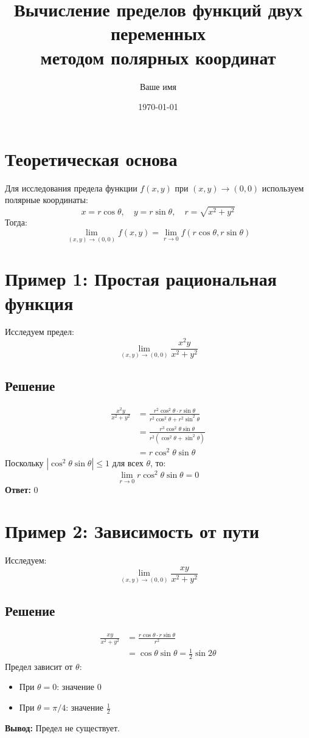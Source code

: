 \documentclass{article}
\title{Вычисление пределов функций двух переменных \\ методом полярных координат}
\author{Ваше имя}
\date{\today}
\begin{document}
\maketitle

\section{Теоретическая основа}
Для исследования предела функции $f(x,y)$ при $(x,y) \to (0,0)$ используем полярные координаты:
\[
x = r\cos\theta, \quad y = r\sin\theta, \quad r = \sqrt{x^2 + y^2}
\]
Тогда:
\[
\lim_{(x,y)\to(0,0)} f(x,y) = \lim_{r\to 0} f(r\cos\theta, r\sin\theta)
\]

\section{Пример 1: Простая рациональная функция}
Исследуем предел:
\[
\lim_{(x,y)\to(0,0)} \frac{x^2 y}{x^2 + y^2}
\]

\subsection{Решение}
\begin{align*}
\frac{x^2 y}{x^2 + y^2} &= \frac{r^2 \cos^2\theta \cdot r\sin\theta}{r^2 \cos^2\theta + r^2 \sin^2\theta} \\
&= \frac{r^3 \cos^2\theta \sin\theta}{r^2 (\cos^2\theta + \sin^2\theta)} \\
&= r \cos^2\theta \sin\theta
\end{align*}
Поскольку $|\cos^2\theta \sin\theta| \leq 1$ для всех $\theta$, то:
\[
\lim_{r\to 0} r \cos^2\theta \sin\theta = 0
\]
\textbf{Ответ:} $\boxed{0}$

\section{Пример 2: Зависимость от пути}
Исследуем:
\[
\lim_{(x,y)\to(0,0)} \frac{xy}{x^2 + y^2}
\]

\subsection{Решение}
\begin{align*}
\frac{xy}{x^2 + y^2} &= \frac{r\cos\theta \cdot r\sin\theta}{r^2} \\
&= \cos\theta \sin\theta = \frac{1}{2}\sin 2\theta
\end{align*}
Предел зависит от $\theta$:
\begin{itemize}
\item При $\theta = 0$: значение $0$
\item При $\theta = \pi/4$: значение $\frac{1}{2}$
\end{itemize}
\textbf{Вывод:} Предел не существует.
\end{document}
